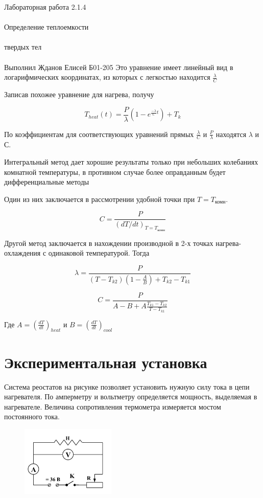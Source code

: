 \documentclass{astroedu-lab}
\begin{document}
\begin{problem}{\huge Лабораторная работа 2.1.4\\\\Определение теплоемкости\\\\твердых тел\\\\Выполнил Жданов Елисей Б01-205}
Это уравнение имеет линейный вид в логарифмических координатах, из которых с легкостью находится $\frac{\lambda}{C}$

Записав похожее уравнение для нагрева, получу

\begin{equation}
	\boxed{T_{heat}(t) = \frac{P}{\lambda} \left(1 - e^{\frac{-\lambda}{C}t}\right) + T_k}
\end{equation}

По коэффициентам для соответствующих уравнений прямых $\frac{\lambda}{C}$ и $\frac{P}{\lambda}$ находятся $\lambda$ и С.

Интегральный метод дает хорошие результаты только при небольших колебаниях комнатной температуры, в противном случае более оправданным будет дифференциальные методы

Один из них заключается в рассмотрении удобной точки при $T = T_{\text{комн}}$.

\begin{equation}
	\boxed{C = \frac{P}{(dT/dt)_{T = T_\text{комн}}}}
\end{equation}

Другой метод заключается в нахождении производной в 2-х точках нагрева-охлаждения с одинаковой температурой. Тогда

\begin{equation}
	\boxed{\lambda = \frac{P}{(T - T_{k2})\left( 1 - \frac{A}{B} \right) + T_{k2} - T_{k1}}}
\end{equation}

\begin{equation}
	\boxed{C = \frac{P}{A - B + A \frac{T_{k1} - T_{k2}}{T-T_{k1}}}}
\end{equation}

Где $A = \left(\frac{dT}{dt}\right)_{heat}$ и $B =\left( \frac{dT}{dt}\right)_{cool}$

 
\section{Экспериментальная установка}

Система реостатов на рисунке позволяет установить нужную силу тока в цепи нагревателя. По амперметру и вольтметру определяется мощность, выделяемая в нагревателе. Величина сопротивления термометра измеряется мостом постоянного тока.

\begin{figure}[!h]
	\centering
	\includegraphics[width=0.4\textwidth]{Схема нагревателя.png}
	\label{fig:boiler}
\end{figure}


\end{problem}
\end{document}

